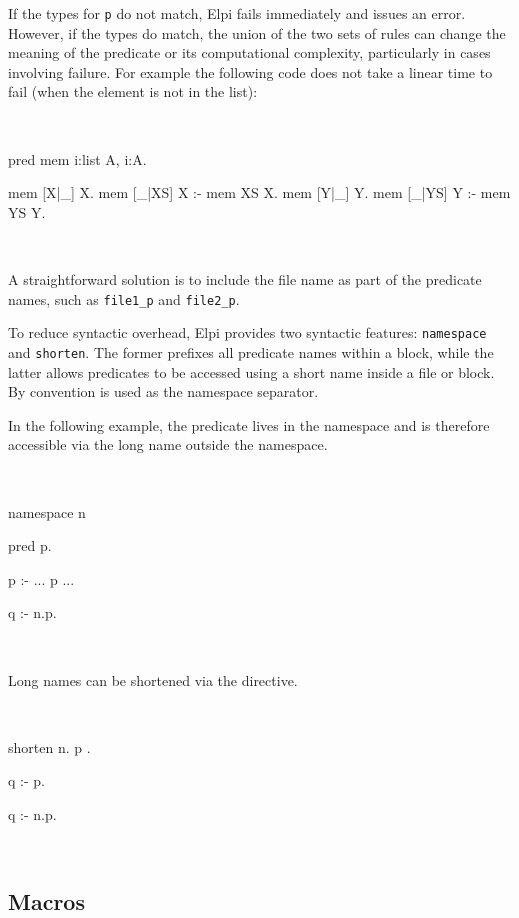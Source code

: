 \documentclass[a4paper, 11pt]{book}
\newenvironment{elpicode}
  {\VerbatimEnvironment~\\\begin{elpibox}\begin{xelpicode}}{\end{xelpicode}
\end{elpibox}\\}
\begin{document}
If the types for \texttt{p} do not match, Elpi fails immediately and issues an
error. However, if the types do match, the union of the two sets of
rules can change the meaning of the predicate or its computational complexity,
particularly in cases involving failure. For example the following code
does not take a linear time to fail (when the element is not in the list):

\begin{elpicode}
pred mem i:list A, i:A.

mem [X|_] X.
mem [_|XS] X :- mem XS X.
mem [Y|_] Y.
mem [_|YS] Y :- mem YS Y.
\end{elpicode}

A straightforward solution is to include the file name as part of the predicate
names, such as \texttt{file1\_p} and \texttt{file2\_p}.

To reduce syntactic overhead, Elpi provides two syntactic features:
\texttt{namespace} and \texttt{shorten}. The former prefixes all predicate
names within a block, while the latter allows predicates to be accessed using a
short name inside a file or block. By convention  is used as
the namespace separator.

In the following example, the predicate  lives in the namespace
 and is therefore accessible via the long name  outside the
namespace.

\begin{elpicode}
namespace n {

  pred p.

  p :- ... p ...

}

q :- n.p.
\end{elpicode}

\noindent
Long names can be shortened via the  directive.

\begin{elpicode}
shorten n.{ p }.

q :- p.

q :- n.p.
\end{elpicode}

\subsection{Macros}\label{sec:macros}
\end{document}
